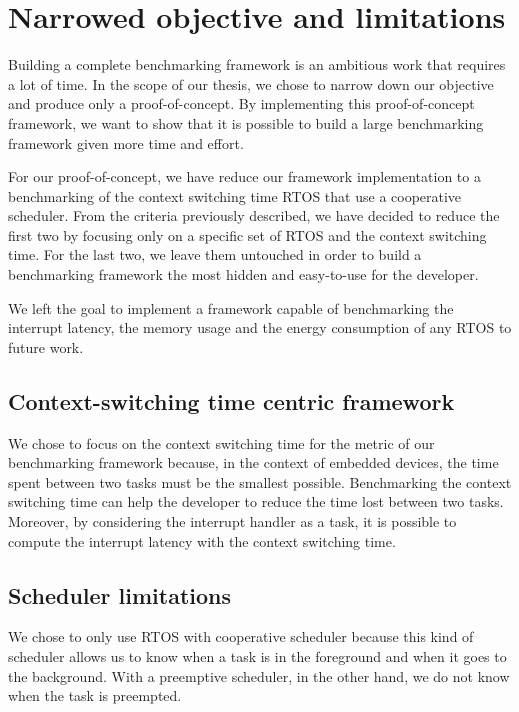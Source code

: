 \section{Narrowed objective and limitations}

Building a complete benchmarking framework is an ambitious work that requires a lot of time.
In the scope of our thesis, we chose to narrow down our objective and produce only a proof-of-concept.
By implementing this proof-of-concept framework, we want to show that it is possible to build a large benchmarking framework given more time and effort.

For our proof-of-concept, we have reduce our framework implementation to a benchmarking of the context switching time RTOS that use a cooperative scheduler.
From the criteria previously described, we have decided to reduce the first two by focusing only on a specific set of RTOS and the context switching time.
For the last two, we leave them untouched in order to build a benchmarking framework the most hidden and easy-to-use for the developer.

We left the goal to implement a framework capable of benchmarking the interrupt latency, the memory usage and the energy consumption of any RTOS to future work.

\subsection{Context-switching time centric framework}

We chose to focus on the context switching time for the metric of our benchmarking framework because, in the context of embedded devices, the time spent between two tasks must be the smallest possible.
Benchmarking the context switching time can help the developer to reduce the time lost between two tasks.
Moreover, by considering the interrupt handler as a task, it is possible to compute the interrupt latency with the context switching time.

\subsection{Scheduler limitations}

We chose to only use RTOS with cooperative scheduler because this kind of scheduler allows us to know when a task is in the foreground and when it goes to the background.
With a preemptive scheduler, in the other hand, we do not know when the task is preempted.


